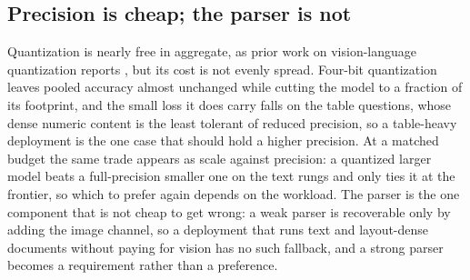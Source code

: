 \documentclass[11pt]{article}
\begin{document}
\subsection{Precision is cheap; the parser is not}
\label{subsec:dep_precision}
Quantization is nearly free in aggregate, as prior work on vision-language quantization reports \citep{wang2024qvlm}, but its cost is not evenly spread. Four-bit quantization leaves pooled accuracy almost unchanged while cutting the model to a fraction of its footprint, and the small loss it does carry falls on the table questions, whose dense numeric content is the least tolerant of reduced precision, so a table-heavy deployment is the one case that should hold a higher precision. At a matched budget the same trade appears as scale against precision: a quantized larger model beats a full-precision smaller one on the text rungs and only ties it at the frontier, so which to prefer again depends on the workload. The parser is the one component that is not cheap to get wrong: a weak parser is recoverable only by adding the image channel, so a deployment that runs text and layout-dense documents without paying for vision has no such fallback, and a strong parser becomes a requirement rather than a preference.



\end{document}
